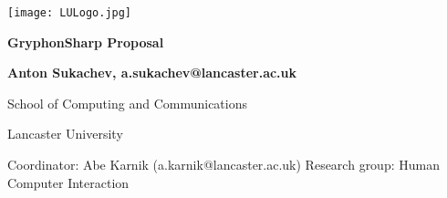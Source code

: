 \documentclass{article}
\begin{document}
\begin{titlepage}

    \center
    
    \texttt{[image: LULogo.jpg]}\vspace{1cm}
    
    \huge  \textbf{GryphonSharp Proposal}
    
    \vspace{2cm}
    
    \Large \textbf{Anton Sukachev, a.sukachev@lancaster.ac.uk}
    
    School of Computing and Communications
    
    Lancaster University
    
    \vfill
    
    Coordinator: Abe Karnik (a.karnik@lancaster.ac.uk)\endgraf
    Research group: Human Computer Interaction
    
    \end{titlepage}
\pagebreak
\end{document}
